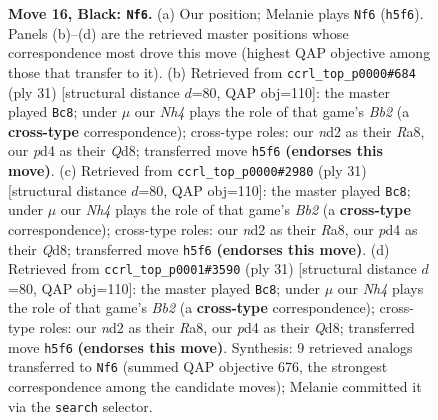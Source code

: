 \documentclass[11pt]{article}
\begin{document}
\begin{figure}[p]
\caption{\textbf{Move 16, Black: \texttt{Nf6}.} (a) Our position; Melanie plays \texttt{Nf6} (\texttt{h5f6}). Panels (b)--(d) are the retrieved master positions whose correspondence most drove this move (highest QAP objective among those that transfer to it). (b) Retrieved from \texttt{ccrl\_top\_p0000\#684} (ply 31) [structural distance $d$=80, QAP obj=110]: the master played \texttt{Bc8}; under $\mu$ our \emph{Nh4} plays the role of that game's \emph{Bb2} (a \textbf{cross-type} correspondence); cross-type roles: our \emph{n}d2 as their \emph{R}a8, our \emph{p}d4 as their \emph{Q}d8; transferred move \texttt{h5f6} \textbf{(endorses this move)}. (c) Retrieved from \texttt{ccrl\_top\_p0000\#2980} (ply 31) [structural distance $d$=80, QAP obj=110]: the master played \texttt{Bc8}; under $\mu$ our \emph{Nh4} plays the role of that game's \emph{Bb2} (a \textbf{cross-type} correspondence); cross-type roles: our \emph{n}d2 as their \emph{R}a8, our \emph{p}d4 as their \emph{Q}d8; transferred move \texttt{h5f6} \textbf{(endorses this move)}. (d) Retrieved from \texttt{ccrl\_top\_p0001\#3590} (ply 31) [structural distance $d$=80, QAP obj=110]: the master played \texttt{Bc8}; under $\mu$ our \emph{Nh4} plays the role of that game's \emph{Bb2} (a \textbf{cross-type} correspondence); cross-type roles: our \emph{n}d2 as their \emph{R}a8, our \emph{p}d4 as their \emph{Q}d8; transferred move \texttt{h5f6} \textbf{(endorses this move)}. Synthesis: 9 retrieved analogs transferred to \texttt{Nf6} (summed QAP objective 676, the strongest correspondence among the candidate moves); Melanie committed it via the \texttt{search} selector.}
\label{fig:thought-m31}
\end{figure}

\clearpage
\end{document}
